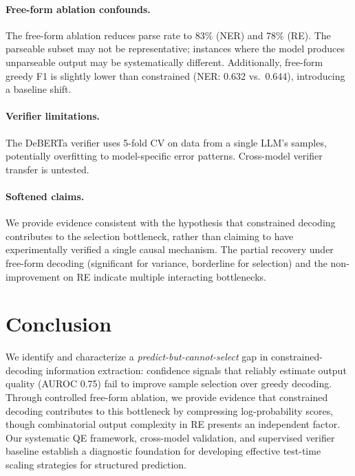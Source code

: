 \documentclass[11pt,a4paper]{article}
\begin{document}
\paragraph{Free-form ablation confounds.} The free-form ablation reduces parse rate to 83\% (NER) and 78\% (RE). The parseable subset may not be representative; instances where the model produces unparseable output may be systematically different. Additionally, free-form greedy F1 is slightly lower than constrained (NER: 0.632 vs.\ 0.644), introducing a baseline shift.

\paragraph{Verifier limitations.} The DeBERTa verifier uses 5-fold CV on data from a single LLM's samples, potentially overfitting to model-specific error patterns. Cross-model verifier transfer is untested.

\paragraph{Softened claims.} We provide evidence consistent with the hypothesis that constrained decoding contributes to the selection bottleneck, rather than claiming to have experimentally verified a single causal mechanism. The partial recovery under free-form decoding (significant for variance, borderline for selection) and the non-improvement on RE indicate multiple interacting bottlenecks.

\section{Conclusion}

We identify and characterize a \emph{predict-but-cannot-select} gap in constrained-decoding information extraction: confidence signals that reliably estimate output quality (AUROC 0.75) fail to improve sample selection over greedy decoding. Through controlled free-form ablation, we provide evidence that constrained decoding contributes to this bottleneck by compressing log-probability scores, though combinatorial output complexity in RE presents an independent factor. Our systematic QE framework, cross-model validation, and supervised verifier baseline establish a diagnostic foundation for developing effective test-time scaling strategies for structured prediction.
\end{document}
